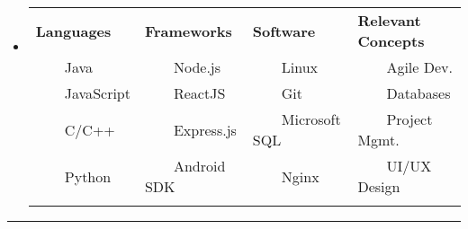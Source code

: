 \documentclass[11pt,a4paper]{article}
\newcommand{\tabitem}{~~\llap{--}~~}
\newenvironment{indentsection}[1]%
{\begin{list}{}%
	{\setlength{\leftmargin}{1.7#1}}%
	\item[]%
}
{\end{list}}
\begin{document}
\begin{itemize}[leftmargin=*]
	\parskip=0.1em	

\item[]

\begin{tabularx}{\textwidth}{X X X X}

\textbf{Languages} & \textbf{Frameworks} & \textbf{Software} & \textbf{Relevant Concepts}\\
\tabitem Java & \tabitem Node.js & \tabitem Linux & \tabitem Agile Dev.\\
\tabitem JavaScript & \tabitem ReactJS  & \tabitem Git & \tabitem Databases\\	
\tabitem C/C++ & \tabitem Express.js  & \tabitem Microsoft SQL & \tabitem Project Mgmt.\\
\tabitem Python & \tabitem Android SDK & \tabitem Nginx & \tabitem UI/UX Design\\
\\




\end{tabularx}

\end{itemize}



\vspace{-1.1em}
\hrule %
\vspace{-0.4em}
\end{document}
